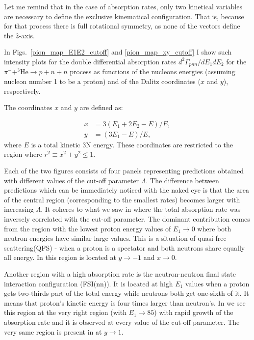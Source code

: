     Let me remind that in the case of absorption rates, only two kinetical variables are
    necessary to define the exclusive kinematical configuration. That is, because for that
    process there is full rotational symmetry, as none of the vectors define the $\hat{z}$-axis.


    In Figs.~\ref{pion_map_E1E2_cutoff} and \ref{pion_map_xy_cutoff} I show such
    intensity plots for the double differential absorption rates
    $d^2 \Gamma_{pnn}/dE_1dE_2$ for the $\pi^- + ^3\text{He} \rightarrow p + n + n$
    process as functions of the nucleons energies (assuming nucleon number 1 to be a proton) and 
    of the Dalitz coordinates ($x$ and $y$), respectively.

    The coordinates $x$ and $y$ are defined as:

    \begin{align}
        x &= 3 (E_1 + 2E_2 - E)/E, \nonumber\\
        y &= (3E_1 - E)/E,
        \label{dalitz_xy}
    \end{align}
    where $E$ is a total kinetic 3N energy. 
    These coordinates are restricted to the region where $r^2 \equiv x^2 + y^2 \leq 1$.

    Each of the two figures consists of four panels representing predictions obtained with different 
    values of the cut-off parameter $\Lambda$. The difference between predictions which can be immediately
    noticed with the naked eye is that the area of the central region (corresponding to the smallest rates)
    becomes larger with increasing $\Lambda$. It coheres to what we saw in 
    where the total absorption rate was inversely correlated with the cut-off parameter. The dominant contribution
    comes from the region with the lowest proton energy values of $E_1 \rightarrow 0$ where both neutron energies 
    have similar large values.
    This is a situation of quasi-free scattering(QFS) - when a proton is a spectator and both neutrons share equally all energy. In  this region is located at $y \rightarrow -1$ and $x \rightarrow 0$. 

    Another region with a high absorption rate is the neutron-neutron final state interaction configuration (FSI(nn)).
    It is located at high $E_1$ values when a proton gets two-thirds part of the total energy while neutrons both get
    one-sixth of it.
    It means that proton's kinetic energy is four times larger than neutron's.
    In  we see this region at the very right region (with $E_1 \rightarrow 85$)
    with rapid growth of the absorption rate and it is observed at every value of the cut-off parameter. The very same region 
    is present in   at $y \rightarrow 1$.

